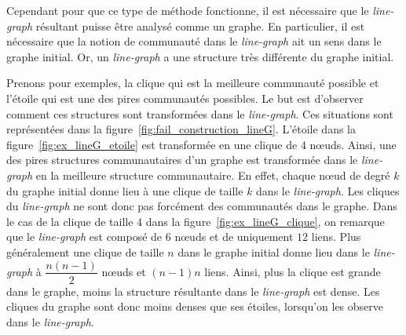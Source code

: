 Cependant pour que ce type de méthode fonctionne, il est nécessaire que le \emph{line-graph} résultant puisse être analysé comme un graphe.
En particulier, il est nécessaire que la notion de communauté dans le \emph{line-graph} ait un sens dans le graphe initial.
Or, un \emph{line-graph} a une structure très différente du graphe initial.


Prenons pour exemples, la clique qui est la meilleure communauté possible et l'étoile qui est une des pires communautés possibles.
Le but est d'observer comment ces structures sont transformées dans le \emph{line-graph}.
Ces situations sont représentées dans la figure~\ref{fig:fail_construction_lineG}.
L'étoile dans la figure~\ref{fig:ex_lineG_etoile} est transformée en une clique de 4 n\oe{}uds.
Ainsi, une des pires structures communautaires d'un graphe est transformée dans le \emph{line-graph} en la meilleure structure communautaire.
En effet, chaque n\oe{}ud de degré $k$ du graphe initial donne lieu à une clique de taille $k$ dans le \emph{line-graph}.
Les cliques du \emph{line-graph} ne sont donc pas forcément des communautés dans le graphe.
Dans le cas de la clique de taille $4$ dans la figure~\ref{fig:ex_lineG_clique}, on remarque que le \emph{line-graph} est composé de $6$ n\oe{}uds et de uniquement $12$ liens.
Plus généralement une clique de taille $n$ dans le graphe initial donne lieu dans le \emph{line-graph} à $\dfrac{n(n-1)}{2}$ n\oe{}uds et $(n-1)n$ liens.
Ainsi, plus la clique est grande dans le graphe, moins la structure résultante dans le \emph{line-graph} est dense.
Les cliques du graphe sont donc moins denses que ses étoiles, lorsqu'on les observe dans le \emph{line-graph}.

